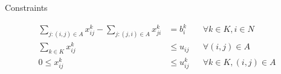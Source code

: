 \documentclass[a4paper,11pt]{elsarticle}
\begin{document}
Constraints

\begin{align}
\sum_{j:(i,j) \in A} x^k_{ij}-\sum_{j:(j,i) \in A} x^k_{ji}
&= b_i^k && \forall k\in K,i\in N \\
\sum_{k\in K} x^k_{ij}&\leq u_{ij} && \forall (i,j)\in A \\
0\leq x^k_{ij} &\leq u_{ij}^k && \forall k\in K,(i,j)\in A
\end{align}









\end{document}
